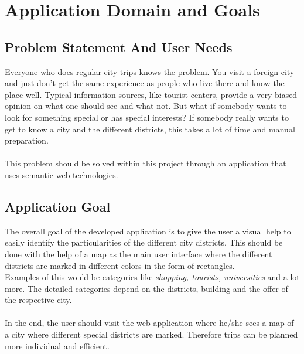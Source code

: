 \section{Application Domain and Goals}

\subsection{Problem Statement And User Needs}
Everyone who does regular city trips knows the problem. You visit a foreign city and just don’t get the same experience as people who live there and know the place well. Typical information sources, like tourist centers, provide a very biased opinion on what one should see and what not. But what if somebody wants to look for something special or has special interests? If somebody really wants to get to know a city and the different districts,  this takes a lot of time and manual preparation. \\ \\
This problem should be solved within this project through an application that uses semantic web technologies.

\subsection{Application Goal}
The overall goal of the developed application is to give the user a visual help to easily identify the particularities of the different city districts. This should be done with the help of a map as the main user interface where the different districts are marked in different colors in the form of rectangles.
\\
Examples of this would be categories like \textit{shopping, tourists, universities} and a lot more. The detailed categories depend on the districts, building and the offer of the respective city. 
\\ \\
In the end, the user should visit the web application where he/she sees a map of a city where different special districts are marked. Therefore trips can be planned more individual and efficient.
